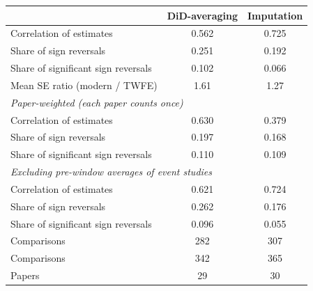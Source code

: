 \begin{tabular}{lcc}
\toprule
 & DiD-averaging & Imputation \\
\midrule
Correlation of estimates & 0.562 & 0.725 \\
Share of sign reversals & 0.251 & 0.192 \\
Share of significant sign reversals & 0.102 & 0.066 \\
Mean SE ratio (modern / TWFE) & 1.61 & 1.27 \\
\midrule
\multicolumn{3}{l}{\emph{Paper-weighted (each paper counts once)}} \\
Correlation of estimates & 0.630 & 0.379 \\
Share of sign reversals & 0.197 & 0.168 \\
Share of significant sign reversals & 0.110 & 0.109 \\
\midrule
\multicolumn{3}{l}{\emph{Excluding pre-window averages of event studies}} \\
Correlation of estimates & 0.621 & 0.724 \\
Share of sign reversals & 0.262 & 0.176 \\
Share of significant sign reversals & 0.096 & 0.055 \\
Comparisons & 282 & 307 \\
\midrule
Comparisons & 342 & 365 \\
Papers & 29 & 30 \\
\bottomrule
\end{tabular}
